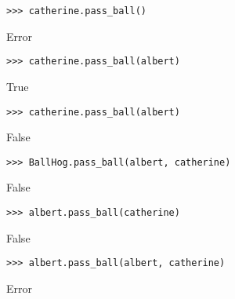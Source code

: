 \begin{blocksection}
\begin{lstlisting}
>>> catherine.pass_ball()
\end{lstlisting}
\begin{solution}[.2in]
Error
\end{solution}

\begin{lstlisting}
>>> catherine.pass_ball(albert)
\end{lstlisting}
\begin{solution}[.2in]
True
\end{solution}

\begin{lstlisting}
>>> catherine.pass_ball(albert)
\end{lstlisting}
\begin{solution}[.2in]
False
\end{solution}

\begin{lstlisting}
>>> BallHog.pass_ball(albert, catherine)
\end{lstlisting}
\begin{solution}[.2in]
False
\end{solution}

\begin{lstlisting}
>>> albert.pass_ball(catherine)
\end{lstlisting}
\begin{solution}[.2in]
False
\end{solution}

\begin{lstlisting}
>>> albert.pass_ball(albert, catherine)
\end{lstlisting}
\begin{solution}[.2in]
Error
\end{solution}
\end{blocksection}
